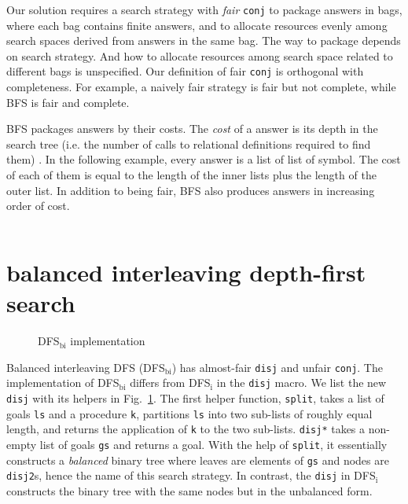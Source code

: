 \documentclass[format=acmlarge, review=true, authordraft=true]{acmart}
\newcommand{\conj}{\texttt{conj}}
\newcommand{\disj}{\texttt{disj}}
\begin{document}

\begin{center}
	\begin{tabular}{c}
		
	\end{tabular}
\end{center}

Our solution requires a search strategy with \emph{fair} \conj{} to 
package answers in bags, where each bag contains finite answers, and to allocate 
resources evenly among search spaces derived from answers in the same bag. The 
way to package depends on search strategy. And how to allocate resources among 
search space related to different bags is unspecified. Our definition of fair 
\conj{} is orthogonal with completeness. For example, a naively fair strategy 
is fair but not complete, while BFS is fair and complete. 

BFS packages answers by their costs. The \emph{cost} of a answer is its 
depth in the search tree (i.e. the number of calls to relational definitions 
required to find them) \citet{seres1999algebra}. In the following example, 
every answer is a list of list of symbol. The cost of each of them is equal to 
the length of the inner lists plus the length of the outer list. In addition to 
being fair, BFS also produces answers in increasing order of cost.

\begin{center}
	\begin{tabular}{c}
		
	\end{tabular}
\end{center}


\section{balanced interleaving depth-first search}

\begin{figure}
	
	\caption{DFS$_\textrm{bi}$ implementation}
	\label{balanced-disj}
\end{figure}

Balanced interleaving DFS (DFS$_\textrm{bi}$) has almost-fair \disj{} and unfair \conj{}. 
The implementation of DFS$_\textrm{bi}$ differs from DFS$_\textrm{i}$ in the \disj{} macro. We list the 
new \disj{} with its helpers in Fig.~\ref{balanced-disj}. The first helper 
function, \texttt{split}, takes a list of goals \texttt{ls} and a procedure 
\texttt{k}, partitions \texttt{ls} into two sub-lists of roughly equal length, 
and returns the application of \texttt{k} to the two sub-lists. \texttt{disj*} 
takes a non-empty list of goals \texttt{gs} and returns a goal. With the help 
of \texttt{split}, it essentially constructs a \emph{balanced} binary tree 
where leaves are elements of \texttt{gs} and nodes are \texttt{disj2}s, hence 
the name of this search strategy. In contrast, the \disj{} in DFS$_\textrm{i}$
constructs the binary tree with the same nodes but in the unbalanced form.
\end{document}
